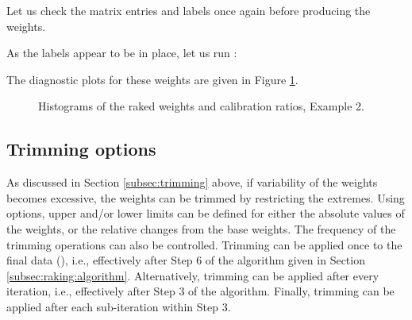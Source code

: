 \begin{stexample}[Example 2]
\begin{stlog}
\nullskip
\end{stlog}

Let us check the matrix entries and labels once again before
producing the weights.

\begin{stlog}
\nullskip
\end{stlog}

As the labels appear to be in place, let us run :

\begin{stlog}
\nullskip
\end{stlog}

The diagnostic plots for these weights are given in Figure \ref{fig:example2}.

\begin{figure}[h!]
\begin{center}
\end{center}
\caption{Histograms of the raked weights and calibration ratios, Example 2.}
\label{fig:example2}
\end{figure}

\end{stexample}

\subsection{Trimming options}
\label{subsec:example:trimming}


As discussed in Section \ref{subsec:trimming} above, if variability of the weights
becomes excessive, the weights can be trimmed by restricting the extremes.
Using  options, upper and/or lower limits can be defined
for either the absolute values of the weights, or the relative changes from
the base weights. The frequency of the trimming operations can also be controlled.
Trimming can be applied once to the final data (), i.e.,
effectively after Step 6 of the algorithm given in Section
\ref{subsec:raking:algorithm}. Alternatively, trimming can be applied after
every iteration, i.e., effectively after Step 3 of the algorithm.
Finally, trimming can be applied after each sub-iteration within Step 3.

